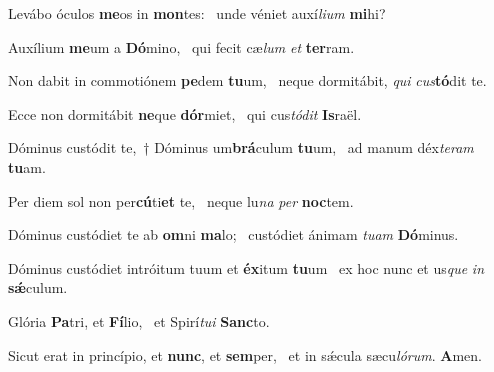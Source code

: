 \item Levábo óculos \textbf{me}os in \textbf{mon}tes:~\psstar{} unde véniet auxí\textit{lium} \textbf{mi}hi?

\item Auxílium \textbf{me}um a \textbf{Dó}mino,~\psstar{} qui fecit cæ\textit{lum} \textit{et} \textbf{ter}ram.

\item Non dabit in commotiónem \textbf{pe}dem \textbf{tu}um,~\psstar{} neque dormitábit, \textit{qui} \textit{cus}\textbf{tó}dit te.

\item Ecce non dormitábit \textbf{ne}que \textbf{dór}miet,~\psstar{} qui cus\textit{tódit} \textbf{Is}raël.

\item Dóminus custódit te,~† Dóminus um\textbf{brá}culum \textbf{tu}um,~\psstar{} ad manum déx\textit{teram} \textbf{tu}am.

\item Per diem sol non per\textbf{cú}ti\textbf{et} te,~\psstar{} neque lu\textit{na} \textit{per} \textbf{noc}tem.

\item Dóminus custódiet te ab \textbf{om}ni \textbf{ma}lo;~\psstar{} custódiet ánimam \textit{tuam} \textbf{Dó}minus.

\item Dóminus custódiet intróitum tuum et \textbf{éx}itum \textbf{tu}um~\psstar{} ex hoc nunc et us\textit{que} \textit{in} \textbf{sǽ}culum.

\item Glória \textbf{Pa}tri, et \textbf{Fí}lio,~\psstar{} et Spirí\textit{tui} \textbf{Sanc}to.

\item Sicut erat in princípio, et \textbf{nunc}, et \textbf{sem}per,~\psstar{} et in sǽcula sæcu\textit{lórum}. \textbf{A}men.